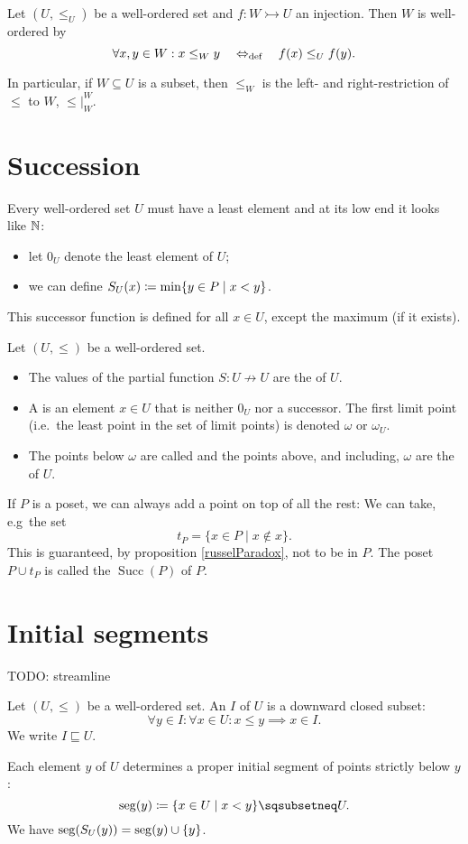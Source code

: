 \begin{lemma} \label{wellOrderingSubsets}
Let $(U,\leq_U)$ be a well-ordered set and $f: W \rightarrowtail U$ an injection. Then $W$ is well-ordered by
\[ \forall x,y\in W: x\leq_W y \quad\Leftrightarrow_{\text{def}}\quad f(x) \leq_U f(y). \]


In particular, if $W\subseteq U$ is a subset, then $\leq_W$ is the left- and right-restriction of $\leq$ to $W$, $\leq|_W^W$.
\end{lemma}

\section{Succession}
Every well-ordered set $U$ must have a least element and at its low end it looks like $\mathbb{N}$:
\begin{itemize}
\item let $0_U$ denote the least element of $U$;
\item we can define $S_U(x) \coloneqq \min\{y\in P\;|\;x<y\}$.
\end{itemize}
This successor function is defined for all $x\in U$, except the maximum (if it exists).

\begin{definition}
Let $(U,\leq)$ be a well-ordered set.
\begin{itemize}
\item The values of the partial function $S: U\not\to U$ are the  of $U$.
\item A  is an element $x\in U$ that is neither $0_U$ nor a successor. The first limit point (i.e.\ the least point in the set of limit points) is denoted $\omega$ or $\omega_U$.
\item The points below $\omega$ are called  and the points above, and including, $\omega$ are the  of $U$.
\end{itemize}
\end{definition}

If $P$ is a poset, we can always add a point on top of all the rest: We can take, e.g\ the set
\[ t_P = \{ x\in P\;|\;x\notin x \}. \]
This is guaranteed, by proposition \ref{russelParadox}, not to be in $P$.
The poset $P\cup t_P$ is called the  $\operatorname{Succ}(P)$ of $P$.

\section{Initial segments}
TODO: streamline
\begin{definition}
Let $(U,\leq)$ be a well-ordered set. An  $I$ of $U$ is a downward closed subset:
\[ \forall y\in I: \forall x\in U: x\leq y \implies x\in I. \]
We write $I \sqsubseteq U$.
\end{definition}
Each element $y$ of $U$ determines a proper initial segment of points strictly below $y$:
\[ \seg(y) \defeq \{ x\in U\;|\; x < y \} \sqsubsetneq U. \]
We have $\operatorname{seg}(S_U(y)) = \operatorname{seg}(y)\cup\{y\}$.

